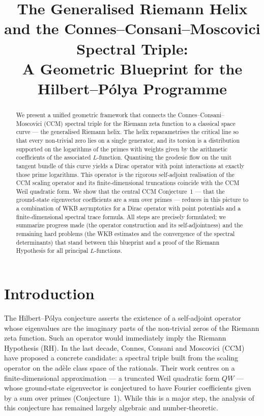 \documentclass[12pt,a4paper]{article}
\title{\bf The Generalised Riemann Helix and the Connes--Consani--Moscovici Spectral Triple:\\A Geometric Blueprint for the Hilbert--P\'olya Programme}
\author{}
\date{}
\begin{document}
\maketitle

\begin{abstract}
We present a unified geometric framework that connects the Connes--Consani--Moscovici (CCM) spectral triple for the Riemann zeta function to a classical space curve --- the generalised Riemann helix.  The helix reparametrises the critical line so that every non‑trivial zero lies on a single generator, and its torsion is a distribution supported on the logarithms of the primes with weights given by the arithmetic coefficients of the associated $L$-function.  Quantising the geodesic flow on the unit tangent bundle of this curve yields a Dirac operator with point interactions at exactly those prime logarithms.  This operator is the rigorous self‑adjoint realisation of the CCM scaling operator and its finite‑dimensional truncations coincide with the CCM Weil quadratic form.  We show that the central CCM Conjecture~1 --- that the ground‑state eigenvector coefficients are a sum over primes --- reduces in this picture to a combination of WKB asymptotics for a Dirac operator with point potentials and a finite‑dimensional spectral trace formula.  All steps are precisely formulated; we summarize progress made (the operator construction and its self‑adjointness) and the remaining hard problems (the WKB estimates and the convergence of the spectral determinants) that stand between this blueprint and a proof of the Riemann Hypothesis for all principal $L$-functions.
\end{abstract}

\section{Introduction}
The Hilbert--P\'olya conjecture asserts the existence of a self‑adjoint operator whose eigenvalues are the imaginary parts of the non‑trivial zeros of the Riemann zeta function.  Such an operator would immediately imply the Riemann Hypothesis (RH).  In the last decade, Connes, Consani and Moscovici (CCM) \cite{CCM2025} have proposed a concrete candidate: a spectral triple built from the scaling operator on the adèle class space of the rationals.  Their work centres on a finite‑dimensional approximation --- a truncated Weil quadratic form $QW$ --- whose ground‑state eigenvector is conjectured to have Fourier coefficients given by a sum over primes (Conjecture~1).  While this is a major step, the analysis of this conjecture has remained largely algebraic and number‑theoretic.
\end{document}
